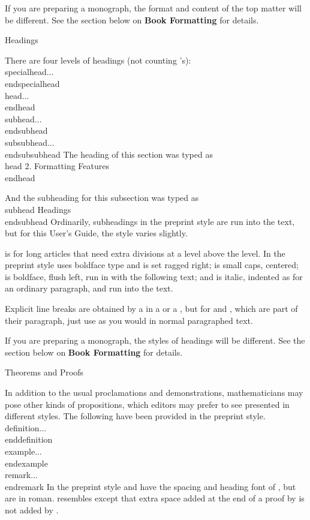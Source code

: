 If you are preparing a monograph, the format and content of the top matter
will be different.  See the section below on {\bf Book Formatting} for
details.


\subhead Headings \endsubhead

There are four levels of headings (not counting
's):
\beginexample{}
\\specialhead...\\endspecialhead
\\head...\\endhead
\\subhead...\\endsubhead
\\subsubhead...\\endsubsubhead
\endexample
\noindent The heading of
this section was typed as
\beginexample{}
\\head 2. Formatting Features
\\endhead
\endexample

\noindent And the subheading for this subsection was typed as
\beginexample{}
\\subhead Headings\\endsubhead
\endexample
\noindent
Ordinarily, subheadings in the preprint style are run into the text, but for
this User's Guide, the style varies slightly.

\indent{} is for long articles that need extra divisions at
a level above the  level. In the preprint style
 uses boldface type and is set ragged right; 
is small caps, centered;  is boldface, flush left,
run in with the following text; and
 is italic, indented as for an ordinary paragraph, and run
into the text.

Explicit line breaks are obtained by a \cs{\\} in a  or a
, but for  and ,
which are part of their paragraph, just use  as
you would in normal paragraphed text.

If you are preparing a monograph, the styles of headings will be different.
See the section below on {\bf Book Formatting} for details.


\subhead Theorems and Proofs \endsubhead

In addition to the usual proclamations and demonstrations, mathematicians
may pose other kinds of propositions, which editors may prefer to see
presented in different styles.  The following have been provided in
the preprint style.
\beginexample{}
\\definition...\\enddefinition
\\example...\\endexample
\\remark...\\endremark
\endexample
\noindent
In the preprint style  and  have
the spacing and heading font of , but are in roman.
 resembles 
except that extra space added at the end of a proof by 
is not added by .

